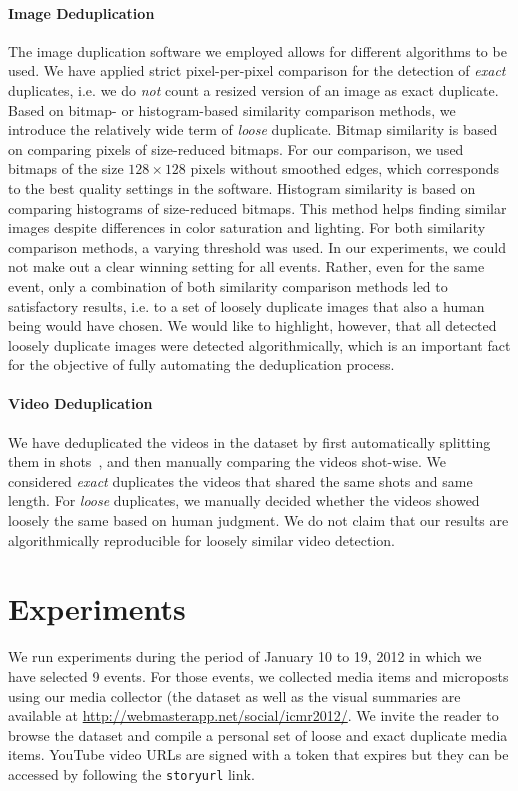 \documentclass{acm_proc_article-sp}
\let\oldemph\emph
\renewcommand{\emph}[1]{\oldemph{\fontsize{9}{9}\selectfont #1}}
\newcommand{\inlinelistingsize}{\fontsize{8pt}{11pt}}
\let\oldurl\url
\renewcommand{\url}[1]{\inlinelistingsize\oldurl{#1}}
\begin{document}
\paragraph{Image Deduplication}
The image duplication software we employed allows for different algorithms to be used. We have applied strict pixel-per-pixel comparison for the detection of \emph{exact} duplicates, i.e. we do \emph{not} count a resized version of an image as exact duplicate. Based on bitmap- or histogram-based similarity comparison methods, we introduce the relatively wide term of \emph{loose} duplicate. Bitmap similarity is based on comparing pixels of size-reduced bitmaps.
For our comparison, we used bitmaps of the size $128 \times 128$ pixels without smoothed edges, which corresponds to the best quality settings in the software.
Histogram similarity is based on comparing histograms of size-reduced bitmaps. This method helps finding similar images despite differences in color saturation and lighting. For both similarity comparison methods, a varying threshold was used. In our experiments, we could not make out a clear winning setting for all events. Rather, even for the same event, only a combination of both similarity comparison methods led to satisfactory results, i.e. to a set of loosely duplicate images that also a human being would have chosen. We would like to highlight, however, that all detected loosely duplicate images were detected algorithmically, which is an important fact for the objective of fully automating the deduplication process.

\paragraph{Video Deduplication}
We have deduplicated the videos in the dataset by first automatically splitting them in shots~\cite{CrowdsourcingEvent}, and then manually comparing the videos shot-wise. We considered \emph{exact} duplicates the videos that shared the same shots and same length. For \emph{loose} duplicates, we manually decided whether the videos showed loosely the same based on human judgment. We do not claim that our results are algorithmically reproducible for loosely similar video detection.


\section{Experiments}                                                       \label{sec:experiments}
We run experiments during the period of January 10 to 19, 2012 in which we have selected 9 events. For those events, we collected media items and microposts using our media collector (the dataset as well as the visual summaries are available at \url{http://webmasterapp.net/social/icmr2012/}. We invite the reader to browse the dataset and compile a personal set of loose and exact duplicate media items. YouTube video URLs are signed with a token that expires but they can be accessed by following the \texttt{storyurl} link.
\end{document}

